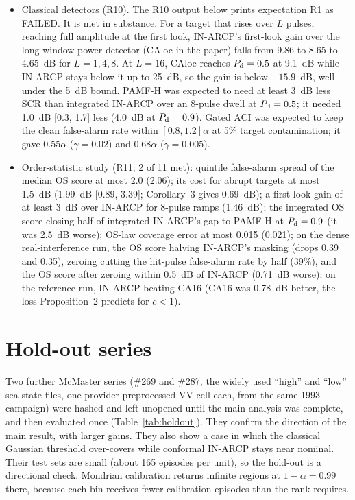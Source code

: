 \documentclass[10pt]{article}
\begin{document}
\begin{itemize}
\item Classical detectors (R10). The R10 output below prints expectation R1 as FAILED. It is met in substance. For a target that rises over $L$ pulses, reaching full amplitude at the first look, IN-ARCP's first-look gain over the long-window power detector (CAloc in the paper) falls from 9.86 to 8.65 to 4.65~dB for $L=1,4,8$. At $L=16$, CAloc reaches $P_{\rm d}=0.5$ at 9.1~dB while IN-ARCP stays below it up to 25~dB, so the gain is below $-15.9$~dB, well under the 5~dB bound. PAMF-H was expected to need at least 3~dB less SCR than integrated IN-ARCP over an 8-pulse dwell at $P_{\rm d}=0.5$; it needed 1.0~dB [0.3, 1.7] less (4.0~dB at $P_{\rm d}=0.9$). Gated ACI was expected to keep the clean false-alarm rate within $[0.8,1.2]\alpha$ at 5\% target contamination; it gave $0.55\alpha$ ($\gamma=0.02$) and $0.68\alpha$ ($\gamma=0.005$).
\item Order-statistic study (R11; 2 of 11 met): quintile false-alarm spread of the median OS score at most 2.0 (2.06); its cost for abrupt targets at most 1.5~dB (1.99~dB [0.89, 3.39]; Corollary~3 gives 0.69~dB); a first-look gain of at least 3~dB over IN-ARCP for 8-pulse ramps (1.46~dB); the integrated OS score closing half of integrated IN-ARCP's gap to PAMF-H at $P_{\rm d}=0.9$ (it was 2.5~dB worse); OS-law coverage error at most 0.015 (0.021); on the dense real-interference run, the OS score halving IN-ARCP's masking (drops 0.39 and 0.35), zeroing cutting the hit-pulse false-alarm rate by half (39\%), and the OS score after zeroing within 0.5~dB of IN-ARCP (0.71~dB worse); on the reference run, IN-ARCP beating CA16 (CA16 was 0.78~dB better, the loss Proposition~2 predicts for $c<1$).
\end{itemize}

\section{Hold-out series}
Two further McMaster series (\#269 and \#287, the widely used ``high'' and ``low'' sea-state files, one provider-preprocessed VV cell each, from the same 1993 campaign) were hashed and left unopened until the main analysis was complete, and then evaluated once (Table~\ref{tab:holdout}). They confirm the direction of the main result, with larger gains. They also show a case in which the classical Gaussian threshold over-covers while conformal IN-ARCP stays near nominal. Their test sets are small (about 165 episodes per unit), so the hold-out is a directional check. Mondrian calibration returns infinite regions at $1-\alpha=0.99$ there, because each bin receives fewer calibration episodes than the rank requires.
\begin{table}[h]
\centering\small
\caption{Hold-out series \#269 and \#287 ($1-\alpha=0.90$; six units per column).}
\label{tab:holdout}

\end{table}
\end{document}
